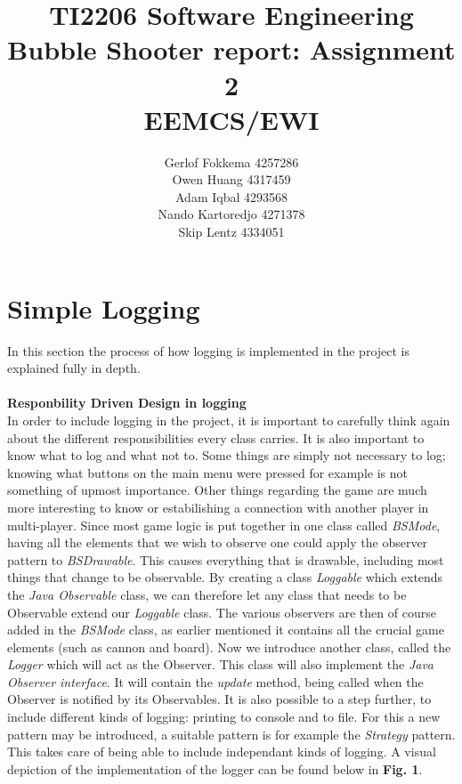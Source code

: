 \documentclass[a4paper,11pt]{article}
\title{TI2206 Software Engineering \\ Bubble Shooter report: Assignment 2 \\ EEMCS/EWI}
\author{Gerlof Fokkema 4257286 \\
	Owen Huang 4317459 \\
	Adam Iqbal 4293568 \\
	Nando Kartoredjo 4271378 \\
	Skip Lentz 4334051 \\
}
\begin{document}
\maketitle
\thispagestyle{empty}

\newpage
\setcounter{page}{1}

\section{Simple Logging \\}
In this section the process of how logging is implemented in the project is explained fully in depth. \\\\
\noindent
\textbf{Responbility Driven Design in logging} \\
\noindent
In order to include logging in the project, it is important to carefully think again about the different responsibilities every class carries. It is also important to know what to log and what not to. Some things are simply not necessary to log; knowing what buttons on the main menu were pressed for example is not something of upmost importance. Other things regarding the game are much more interesting to know or estabilishing a connection with another player in multi-player. Since most game logic is put together in one class called \textit{BSMode}, having all the elements that we wish to observe one could apply the observer pattern to \textit{BSDrawable}. This causes everything that is drawable, including most things that change to be observable. By creating a class \textit{Loggable} which extends the \textit{Java Observable} class, we can therefore let any class that needs to be Observable extend our \textit{Loggable} class. The various observers are then of course added in the \textit{BSMode} class, as earlier mentioned it contains all the crucial game elements (such as cannon and board). Now we introduce another class, called the \textit{Logger} which will act as the Observer. This class will also implement the \textit{Java Observer interface}. It will contain the \textit{update} method, being called when the Observer is notified by its Observables. It is also possible to a step further, to include different kinds of logging: printing to console and to file. For this a new pattern may be introduced, a suitable pattern is for example the \textit{Strategy} pattern. This takes care of being able to include independant kinds of logging. A visual depiction of the implementation of the logger can be found below in \textbf{Fig. 1}.
\end{document}
